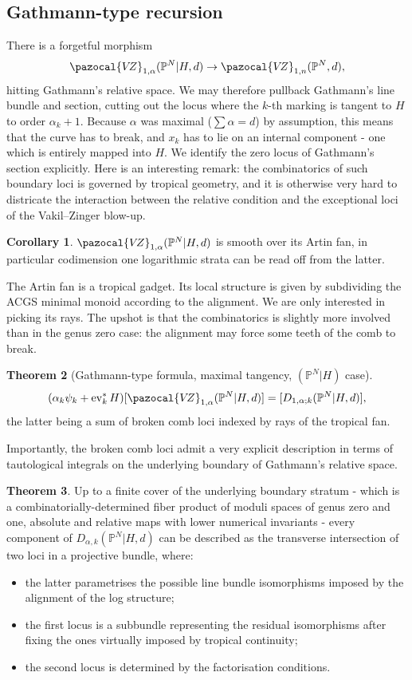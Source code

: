 \documentclass[11pt]{amsart}
\newcommand{\PP}{\mathbb P}
\newcommand{\VZ}{\pazocal{V\!Z}}
\renewcommand{\to}{\rightarrow}
\newcommand{\ev}{\operatorname{ev}}
\theoremstyle{definition}
\newtheorem{thm}{Theorem}[section]
\newtheorem{cor}[thm]{Corollary}
\theoremstyle{definition}
\begin{document}
\subsection{Gathmann-type recursion} There is a forgetful morphism \[\VZ_{1,\alpha}(\PP^N|H,d)\to \VZ_{1,n}(\PP^N,d),\] hitting Gathmann's relative space. We may therefore pullback Gathmann's line bundle and section, cutting out the locus where the $k$-th marking is tangent to $H$ to order $\alpha_k+1$. Because $\alpha$ was maximal ($\sum\alpha=d$) by assumption, this means that the curve has to break, and $x_k$ has to lie on an internal component - one which is entirely mapped into $H$. We identify the zero locus of Gathmann's section explicitly. Here is an interesting remark: the combinatorics of such boundary loci is governed by tropical geometry, and it is otherwise very hard to districate the interaction between the relative condition and the exceptional loci of the Vakil--Zinger blow-up.
\begin{cor}
 $\VZ_{1,\alpha}(\PP^N|H,d)$ is smooth over its Artin fan, in particular codimension one logarithmic strata can be read off from the latter.
\end{cor}
The Artin fan is a tropical gadget. Its local structure is given by subdividing the ACGS minimal monoid according to the alignment. We are only interested in picking its rays. The upshot is that the combinatorics is slightly more involved than in the genus zero case: the alignment may force some teeth of the comb to break.
\begin{thm}[Gathmann-type formula, maximal tangency, $(\PP^N|H)$ case]
 \[(\alpha_k\psi_k+\ev_k^*H)[\VZ_{1,\alpha}(\PP^N|H,d)]=[D_{1,\alpha;k}(\PP^N|H,d)],\]
 the latter being a sum of broken comb loci indexed by rays of the tropical fan.
\end{thm}
Importantly, the broken comb loci admit a very explicit description in terms of tautological integrals on the underlying boundary of Gathmann's relative space.
\begin{thm}
 Up to a finite cover of the underlying boundary stratum - which is a combinatorially-determined fiber product of moduli spaces of genus zero and one, absolute and relative maps with lower numerical invariants - every component of $D_{\alpha,k}(\PP^N|H,d)$ can be described as the transverse intersection of two loci in a projective bundle, where:
 \begin{itemize}
  \item the latter parametrises the possible line bundle isomorphisms imposed by the alignment of the log structure;
  \item the first locus is a subbundle representing the residual isomorphisms after fixing the ones virtually imposed by tropical continuity;
  \item the second locus is determined by the factorisation conditions.
 \end{itemize}
\end{thm}
\end{document}
